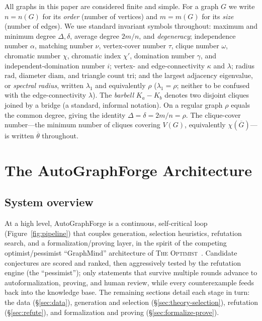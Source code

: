 \documentclass[]{ceurart}
\begin{document}
All graphs in this paper are considered finite and simple. For a graph $G$ we write
$n=n(G)$ for its \emph{order} (number of vertices) and $m=m(G)$ for its
\emph{size} (number of edges). We use standard invariant symbols throughout:
maximum and minimum degree $\Delta,\delta$, average degree $2m/n$, and
\emph{degeneracy}; independence number $\alpha$, matching number $\nu$,
vertex-cover number $\tau$, clique number $\omega$, chromatic number $\chi$,
chromatic index $\chi'$, domination number $\gamma$, and independent-domination
number $i$; vertex- and edge-connectivity $\kappa$ and $\lambda$; radius
$\mathrm{rad}$, diameter $\mathrm{diam}$, and triangle count $\mathrm{tri}$; and
the largest adjacency eigenvalue, or \emph{spectral radius}, written $\lambda_1$
and equivalently $\rho$ ($\lambda_1=\rho$; neither to be
confused with the edge-connectivity $\lambda$). The \emph{barbell} $K_a\!-\!K_b$ denotes two disjoint cliques joined by a bridge (a standard, informal notation).
On a regular graph $\rho$ equals the common degree, giving the identity
$\Delta=\delta=2m/n=\rho$. The clique-cover number---the minimum number of
cliques covering $V(G)$, equivalently $\chi(\overline G)$---is written
$\overline{\theta}$ throughout. 

\section{The AutoGraphForge Architecture}

\subsection{System overview}
\label{sec:pipeline-fig}
At a high level, \textsf{AutoGraphForge} is a continuous, self-critical loop
(Figure~\ref{fig:pipeline}) that couples generation, selection heuristics,
refutation search, and a formalization/proving layer, in the spirit of the
competing optimist/pessimist ``GraphMind'' architecture of
\textsc{The Optimist}~\cite{davila2024optimist}. Candidate conjectures are scored
and ranked, then aggressively tested by the refutation engine (the
``pessimist''); only statements that survive multiple rounds advance to
autoformalization, proving, and human review, while every counterexample feeds
back into the knowledge base. The remaining sections detail each stage in turn:
the data (\S\ref{sec:data}), generation and selection (\S\ref{sec:theory-selection}),
refutation (\S\ref{sec:refute}), and formalization and proving
(\S\ref{sec:formalize-prove}).
\end{document}
